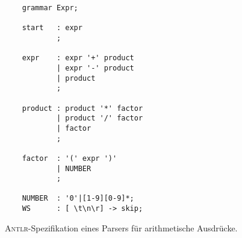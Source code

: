 \begin{figure}[!ht]
\centering
\begin{verbatim}
    grammar Expr;
    
    start   : expr
            ;
    
    expr    : expr '+' product 
            | expr '-' product
            | product        
            ;
    
    product : product '*' factor 
            | product '/' factor 
            | factor
            ;
    
    factor  : '(' expr ')'
            | NUMBER
            ;
    
    NUMBER  : '0'|[1-9][0-9]*;
    WS      : [ \t\n\r] -> skip;
\end{verbatim}
\vspace*{-0.3cm}
\caption{\textsc{Antlr}-Spezifikation eines Parsers f\"ur arithmetische Ausdr\"ucke.}
\label{fig:Expr.g4}
\end{figure}


